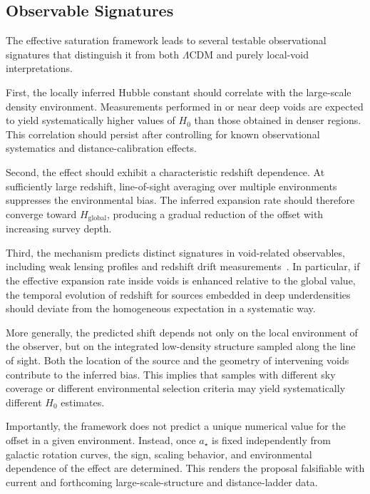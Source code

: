 \subsection{Observable Signatures}
  \label{subsec:void_signatures}

  The effective saturation framework leads to several testable
  observational signatures that distinguish it from both
  $\Lambda$CDM and purely local-void interpretations.

  First, the locally inferred Hubble constant should correlate
  with the large-scale density environment.
  Measurements performed in or near deep voids are expected to yield
  systematically higher values of $H_0$ than those obtained in
  denser regions.
  This correlation should persist after controlling for known
  observational systematics and distance-calibration effects.

  Second, the effect should exhibit a characteristic redshift
  dependence.
  At sufficiently large redshift, line-of-sight averaging over
  multiple environments suppresses the environmental bias.
  The inferred expansion rate should therefore converge toward
  $H_{\mathrm{global}}$, producing a gradual reduction of the
  offset with increasing survey depth.

  Third, the mechanism predicts distinct signatures in void-related
  observables, including weak lensing profiles and redshift drift
  measurements~\cite{Cai2017VoidLensing}.
  In particular, if the effective expansion rate inside voids is
  enhanced relative to the global value, the temporal evolution
  of redshift for sources embedded in deep underdensities should
  deviate from the homogeneous expectation in a systematic way.

  More generally, the predicted shift depends not only on the
  local environment of the observer, but on the integrated
  low-density structure sampled along the line of sight.
  Both the location of the source and the geometry of intervening
  voids contribute to the inferred bias.
  This implies that samples with different sky coverage or
  different environmental selection criteria may yield
  systematically different $H_0$ estimates.

  Importantly, the framework does not predict a unique numerical
  value for the offset in a given environment.
  Instead, once $a_\star$ is fixed independently from galactic
  rotation curves, the sign, scaling behavior, and environmental
  dependence of the effect are determined.
  This renders the proposal falsifiable with current and
  forthcoming large-scale-structure and distance-ladder data.
